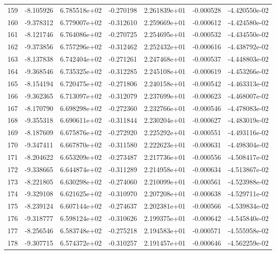 \begin{tabular}{rrrrrrr}
 159 &  -8.105926 &  6.785518e+02 & -0.270198 &  2.261839e+01 &   -0.000528 & -4.420550e-02 \\
 160 &  -9.378312 &  6.779007e+02 & -0.312610 &  2.259669e+01 &   -0.000612 & -4.424580e-02 \\
 161 &  -8.121746 &  6.764086e+02 & -0.270725 &  2.254695e+01 &   -0.000532 & -4.434550e-02 \\
 162 &  -9.373856 &  6.757296e+02 & -0.312462 &  2.252432e+01 &   -0.000616 & -4.438792e-02 \\
 163 &  -8.137838 &  6.742404e+02 & -0.271261 &  2.247468e+01 &   -0.000537 & -4.448803e-02 \\
 164 &  -9.368546 &  6.735325e+02 & -0.312285 &  2.245108e+01 &   -0.000619 & -4.453266e-02 \\
 165 &  -8.154194 &  6.720475e+02 & -0.271806 &  2.240158e+01 &   -0.000542 & -4.463313e-02 \\
 166 &  -9.362365 &  6.713097e+02 & -0.312079 &  2.237699e+01 &   -0.000623 & -4.468007e-02 \\
 167 &  -8.170790 &  6.698298e+02 & -0.272360 &  2.232766e+01 &   -0.000546 & -4.478083e-02 \\
 168 &  -9.355318 &  6.690611e+02 & -0.311844 &  2.230204e+01 &   -0.000627 & -4.483019e-02 \\
 169 &  -8.187609 &  6.675876e+02 & -0.272920 &  2.225292e+01 &   -0.000551 & -4.493116e-02 \\
 170 &  -9.347411 &  6.667870e+02 & -0.311580 &  2.222623e+01 &   -0.000631 & -4.498304e-02 \\
 171 &  -8.204622 &  6.653209e+02 & -0.273487 &  2.217736e+01 &   -0.000556 & -4.508417e-02 \\
 172 &  -9.338665 &  6.644874e+02 & -0.311289 &  2.214958e+01 &   -0.000634 & -4.513867e-02 \\
 173 &  -8.221805 &  6.630298e+02 & -0.274060 &  2.210099e+01 &   -0.000561 & -4.523988e-02 \\
 174 &  -9.329108 &  6.621625e+02 & -0.310970 &  2.207208e+01 &   -0.000638 & -4.529711e-02 \\
 175 &  -8.239124 &  6.607144e+02 & -0.274637 &  2.202381e+01 &   -0.000566 & -4.539834e-02 \\
 176 &  -9.318777 &  6.598124e+02 & -0.310626 &  2.199375e+01 &   -0.000642 & -4.545840e-02 \\
 177 &  -8.256546 &  6.583748e+02 & -0.275218 &  2.194583e+01 &   -0.000571 & -4.555958e-02 \\
 178 &  -9.307715 &  6.574372e+02 & -0.310257 &  2.191457e+01 &   -0.000646 & -4.562259e-02 \\

\end{tabular}
